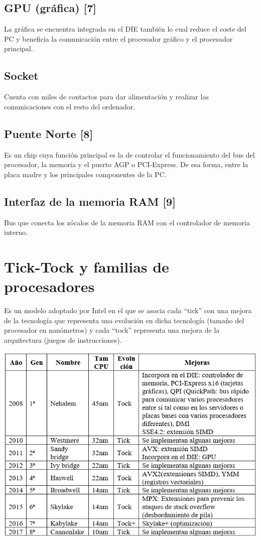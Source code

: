 \documentclass[11pt,letterpaper]{article}
\begin{document}
\subsection{GPU (gráfica) [7]}
\noindent
La gráfica se encuentra integrada en el DIE también lo cual reduce el coste del PC y beneficia la comunicación entre el procesador gráfico y el procesador principal.
\subsection{Socket}
\noindent
Cuenta con miles de contactos para dar alimentación y realizar las comunicaciones con el resto del ordenador.
\subsection{Puente Norte [8]}
\noindent
Es un chip cuya función principal es la de controlar el funcionamiento del bus del procesador, la memoria y el puerto AGP o PCI-Express. De esa forma, entre la placa madre y los principales componentes de la PC.
\subsection{Interfaz de la memoria RAM [9]}
\noindent
Bus que conecta los zócalos de la memoria RAM con el controlador de memoria interno.

\newpage
\section{Tick-Tock y familias de procesadores}
\noindent
Es un modelo adoptado por Intel en el que se asocia cada “tick” con una mejora de la tecnología que representa una evolución en dicha tecnología (tamaño del procesador en nanómetros) y cada “tock” representa una mejora de la arquitectura (juegos de instrucciones).
\begin{center}
	\includegraphics[scale=0.9]{TickTock.png}
\end{center}
\end{document}
